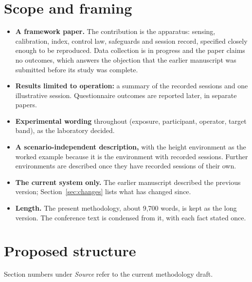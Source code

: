 \documentclass[11pt,a4paper]{article}
\begin{document}
\section{Scope and framing}
\label{sec:scope}

\begin{itemize}
    \item \textbf{A framework paper.} The contribution is the apparatus:
    sensing, calibration, index, control law, safeguards and session
    record, specified closely enough to be reproduced. Data collection
    is in progress and the paper claims no outcomes, which answers the
    objection that the earlier manuscript was submitted before its study
    was complete.

    \item \textbf{Results limited to operation:} a summary of the
    recorded sessions and one illustrative session. Questionnaire
    outcomes are reported later, in separate papers.

    \item \textbf{Experimental wording} throughout (exposure,
    participant, operator, target band), as the laboratory decided.

    \item \textbf{A scenario-independent description,} with the height
    environment as the worked example because it is the environment
    with recorded sessions. Further environments are described once
    they have recorded sessions of their own.

    \item \textbf{The current system only.} The earlier manuscript
    described the previous version; Section~\ref{sec:changes} lists
    what has changed since.

    \item \textbf{Length.} The present methodology, about 9,700 words,
    is kept as the long version. The conference text is condensed from
    it, with each fact stated once.
\end{itemize}

\section{Proposed structure}
\label{sec:structure}

Section numbers under \emph{Source} refer to the current methodology
draft.
\end{document}
